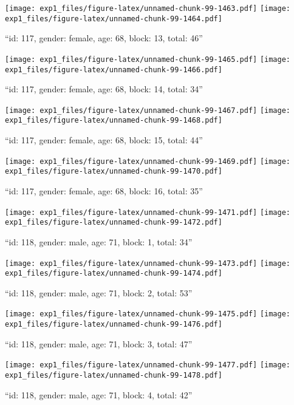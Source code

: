 \documentclass[,]{article}
\begin{document}
\texttt{[image: exp1\_files/figure-latex/unnamed-chunk-99-1463.pdf]}
\texttt{[image: exp1\_files/figure-latex/unnamed-chunk-99-1464.pdf]}

\newpage
[1] 

``id: 117, gender: female, age: 68, block: 13, total: 46''

\texttt{[image: exp1\_files/figure-latex/unnamed-chunk-99-1465.pdf]}
\texttt{[image: exp1\_files/figure-latex/unnamed-chunk-99-1466.pdf]}

\newpage
[1] 

``id: 117, gender: female, age: 68, block: 14, total: 34''

\texttt{[image: exp1\_files/figure-latex/unnamed-chunk-99-1467.pdf]}
\texttt{[image: exp1\_files/figure-latex/unnamed-chunk-99-1468.pdf]}

\newpage
[1] 

``id: 117, gender: female, age: 68, block: 15, total: 44''

\texttt{[image: exp1\_files/figure-latex/unnamed-chunk-99-1469.pdf]}
\texttt{[image: exp1\_files/figure-latex/unnamed-chunk-99-1470.pdf]}

\newpage
[1] 

``id: 117, gender: female, age: 68, block: 16, total: 35''

\texttt{[image: exp1\_files/figure-latex/unnamed-chunk-99-1471.pdf]}
\texttt{[image: exp1\_files/figure-latex/unnamed-chunk-99-1472.pdf]}

\newpage
[1] 

``id: 118, gender: male, age: 71, block: 1, total: 34''

\texttt{[image: exp1\_files/figure-latex/unnamed-chunk-99-1473.pdf]}
\texttt{[image: exp1\_files/figure-latex/unnamed-chunk-99-1474.pdf]}

\newpage
[1] 

``id: 118, gender: male, age: 71, block: 2, total: 53''

\texttt{[image: exp1\_files/figure-latex/unnamed-chunk-99-1475.pdf]}
\texttt{[image: exp1\_files/figure-latex/unnamed-chunk-99-1476.pdf]}

\newpage
[1] 

``id: 118, gender: male, age: 71, block: 3, total: 47''

\texttt{[image: exp1\_files/figure-latex/unnamed-chunk-99-1477.pdf]}
\texttt{[image: exp1\_files/figure-latex/unnamed-chunk-99-1478.pdf]}

\newpage
[1] 

``id: 118, gender: male, age: 71, block: 4, total: 42''
\end{document}
